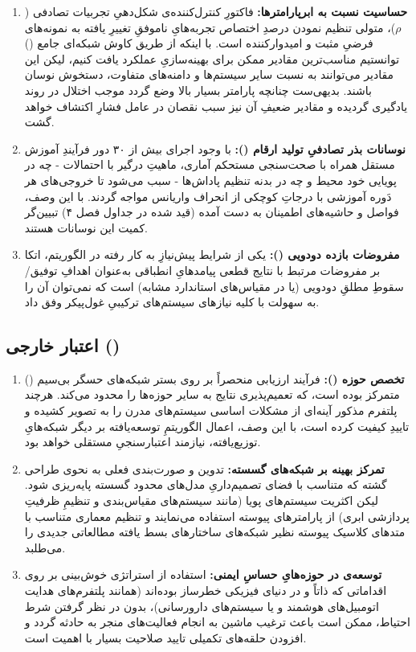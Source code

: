 \documentclass[oneside,openany,phd]{TMU-Thesis}
\begin{document}
\begin{enumerate}
  \item \textbf{حساسیت نسبت به ابرپارامترها:} فاکتورِ کنترل‌کننده‌ی شکل‌دهیِ تجربیات تصادفی ($\rho$)، متولی تنظیم نمودن درصدِ اختصاص تجربه‌هایِ ناموفقِ تغییرِ یافته به نمونه‌های فرضیِ مثبت و امیدوارکننده است. با اینکه از طریق کاوش شبکه‌ای جامع () توانستیم مناسب‌ترین مقادیر ممکن برای بهینه‌سازیِ عملکرد یافت کنیم، لیکن این مقادیر می‌توانند به نسبت سایر سیستم‌ها و دامنه‌های متفاوت، دستخوش نوسان باشند. بدیهی‌ست چنانچه پارامتر بسیار بالا وضع گردد موجب اختلال در روند یادگیری گردیده و مقادیر ضعیفِ آن نیز سبب نقصان در عامل فشارِ اکتشاف خواهد گشت.
  \item \textbf{نوسانات بذر تصادفیِ تولید ارقام ():} با وجود اجرای بیش از ۳۰ دور فرآیندِ آموزش مستقل همراه با صحت‌سنجی مستحکم آماری، ماهیتِ درگیر با احتمالات - چه در پویایی خود محیط و چه در بدنه تنظیم پاداش‌ها - سبب می‌شود تا خروجی‌های هر دَوره آموزشی با درجاتِ کوچکی از انحراف واریانس مواجه گردند. با این وصف، فواصل و حاشیه‌های اطمینان به دست آمده (قید شده در جداول فصل ۴) تبیین‌گر کمیت این نوسانات هستند.
  \item \textbf{مفروضات بازده دودویی ():} یکی از شرایط پیش‌نیازِ به کار رفته در الگوریتم، اتکا بر مفروضات مرتبط با نتایج قطعی پیامدهایِ انطباقی به‌عنوان اهدافِ توفیق/سقوطِ مطلقِ دودویی (یا در مقیاس‌های استاندارد مشابه) است که نمی‌توان آن را به سهولت با کلیه نیازهای سیستم‌های ترکیبیِ غول‌پیکر وفق داد.
\end{enumerate}

\subsection{اعتبار خارجی ()}

\begin{enumerate}
  \item \textbf{تخصص حوزه ():} فرآیند ارزیابی منحصراً بر روی بستر شبکه‌های حسگر بی‌سیم () متمرکز بوده است، که تعمیم‌پذیری نتایج به سایر حوزه‌ها را محدود می‌کند. هرچند پلتفرم مذکور آینه‌ای از مشکلات اساسی سیستم‌های مدرن را به تصویر کشیده و تاییدِ کیفیت کرده است، با این وصف، اعمال الگوریتمِ توسعه‌یافته بر دیگر شبکه‌هایِ توزیع‌یافته، نیازمند اعتبارسنجیِ مستقلی خواهد بود.
  \item \textbf{تمرکز بهینه بر شبکه‌های گسسته:} تدوین و صورت‌بندی فعلی به نحوی طراحی گشته که متناسب با فضای تصمیم‌داریِ مدل‌های محدود گسسته پایه‌ریزی شود. لیکن اکثریت سیستم‌های پویا (مانند سیستم‌های مقیاس‌بندی و تنظیمِ ظرفیتِ پردازشی‌ ابری) از پارامترهای پیوسته استفاده می‌نمایند و تنظیم معماری  متناسب با متدهای کلاسیک پیوسته نظیر شبکه‌های  ساختارهای بسط یافته مطالعاتی جدیدی را می‌طلبد.
  \item \textbf{توسعه‌ی در حوزه‌هایِ حساسِ ایمنی:} استفاده از استراتژی خوش‌بینی بر روی اقداماتی که ذاتاً و در دنیای فیزیکی خطرساز بوده‌اند (همانند پلتفرم‌های هدایت اتومبیل‌های هوشمند و یا سیستم‌های دارورسانی)، بدون در نظر گرفتن شرط احتیاط، ممکن است باعث ترغیب ماشین به انجام فعالیت‌های منجر به حادثه گردد و افزودن حلقه‌های تکمیلی تایید صلاحیت بسیار با اهمیت است.
\end{enumerate}
\end{document}
